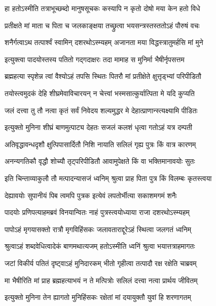 \twolineshloka
{हा हतोऽस्मीति तत्राभूच्छब्दो मानुषसूचकः}
{कस्यापि न कृतो दोषो मया केन हतो विधे} %

\twolineshloka
{प्रतीक्षते मां माता च पिता च जलकाङ्क्षया}
{तच्छ्रुत्वा भयसन्त्रस्तस्ततोऽहं पौरुषं वचः} %

\twolineshloka
{शनैर्गत्वाऽथ तत्पार्श्वं स्वामिन् दशरथोऽस्म्यहम्}
{अजानता मया विद्धस्त्रातुमर्हसि मां मुने} %

\twolineshloka
{इत्युक्त्वा पादयोस्तस्य पतितो गद्गदाक्षरः}
{तदा मामाह स मुनिर्मा भैषीर्नृपसत्तम} %

\twolineshloka
{ब्रह्महत्या स्पृशेन्न त्वां वैश्योऽहं तपसि स्थितः}
{पितरौ मां प्रतीक्षेते क्षुत्तृड्भ्यां परिपीडितौ} %

\twolineshloka
{तयोस्त्वमुदकं देहि शीघ्रमेवाविचारयन्}
{न चेत्त्वां भस्मसात्कुर्यात्पिता मे यदि कुप्यति} %

\twolineshloka
{जलं दत्त्वा तु तौ नत्वा कृतं सर्वं निवेदय}
{शल्यमुद्धर मे देहात्प्राणान्स्त्यक्ष्यामि पीडितः} %

\twolineshloka
{इत्युक्तो मुनिना शीघ्रं बाणमुत्पाट्य देहतः}
{सजलं कलशं धृत्वा गतोऽहं यत्र दम्पती} %

\twolineshloka
{अतिवृद्धावन्धदृशौ क्षुत्पिपासार्दितौ निशि}
{नायाति सलिलं गृह्य पुत्रः किं वात्र कारणम्} %

\twolineshloka
{अनन्यगतिकौ वृद्धौ शोच्यौ तृट्परिपीडितौ}
{आवामुपेक्षते किं वा भक्तिमानावयोः सुतः} %

\twolineshloka
{इति चिन्ताव्याकुलौ तौ मत्पादन्यासजं ध्वनिम्}
{श्रुत्वा प्राह पिता पुत्र किं विलम्बः कृतस्त्वया} %

\twolineshloka
{देह्यावयोः सुपानीयं पिब त्वमपि पुत्रक}
{इत्येवं लपतोर्भीत्या सकाशमगमं शनैः} %

\twolineshloka
{पादयोः प्रणिपत्याहमब्रवं विनयान्वितः}
{नाहं पुत्रस्त्वयोध्याया राजा दशरथोऽस्म्यहम्} %

\twolineshloka
{पापोऽहं मृगयासक्तो रात्रौ मृगविहिंसकः}
{जलावताराद्दूरेऽहं स्थित्वा जलगतं ध्वनिम्} %

\twolineshloka
{श्रुत्वाऽहं शब्दवेधित्वादेकं बाणमथात्यजम्}
{हतोऽस्मीति ध्वनिं श्रुत्वा भयात्तत्राहमागतः} %

\twolineshloka
{जटां विकीर्य पतितं दृष्ट्वाऽहं मुनिदारकम्}
{भीतो गृहीत्वा तत्पादौ रक्ष रक्षेति चाब्रवम्} %

\twolineshloka
{मा भैषीरिति मां प्राह ब्रह्महत्याभयं न ते}
{मत्पित्रोः सलिलं दत्त्वा नत्वा प्रार्थय जीवितम्} %

\twolineshloka
{इत्युक्तो मुनिना तेन ह्यागतो मुनिहिंसकः}
{रक्षेतां मां दयायुक्तौ युवां हि शरणागतम्} %

